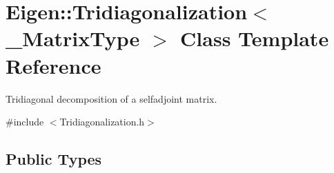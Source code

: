 \hypertarget{class_eigen_1_1_tridiagonalization}{}\section{Eigen\+::Tridiagonalization$<$ \+\_\+\+Matrix\+Type $>$ Class Template Reference}
\label{class_eigen_1_1_tridiagonalization}


Tridiagonal decomposition of a selfadjoint matrix.  




{\ttfamily \#include $<$Tridiagonalization.\+h$>$}

\subsection*{Public Types}

